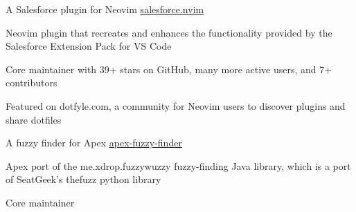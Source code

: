 

\begin{cventries}

  \cventry
    {A Salesforce plugin for Neovim} 
    {\href{https://github.com/jonathanmorris180/salesforce.nvim}{\color{awesome-skyblue}salesforce.nvim}} 
    {} %
    {} %
    {
      \begin{cvitems} %
        \item {Neovim plugin that recreates and enhances the functionality provided by the Salesforce Extension Pack for VS Code}
        \item {Core maintainer with 39+ stars on GitHub, many more active users, and 7+ contributors}
        \item {Featured on dotfyle.com, a community for Neovim users to discover plugins and share dotfiles}
      \end{cvitems}
    }

  \cventry
    {A fuzzy finder for Apex} 
    {\href{https://github.com/jonathanmorris180/apex-fuzzy-finder}{\color{awesome-skyblue}apex-fuzzy-finder}} 
    {} %
    {} %
    {
      \begin{cvitems} %
        \item {Apex port of the me.xdrop.fuzzywuzzy fuzzy-finding Java library, which is a port of SeatGeek's thefuzz python library}
        \item {Core maintainer}
      \end{cvitems}
    }

\end{cventries}
